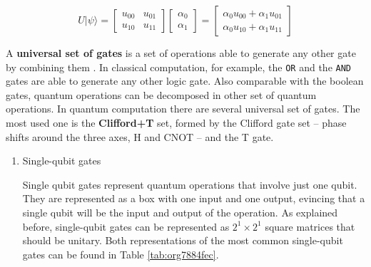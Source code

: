 \begin{enumerate}
\begin{equation}
\label{eq:org6b853ff}
U |\psi\rangle=\begin{bmatrix}u_{00}&u_{01}\\u_{10}&u_{11}\end{bmatrix} \begin{bmatrix}\alpha_0 \\ \alpha_1 \end{bmatrix} = \begin{bmatrix}\alpha_0 u_{00} + \alpha_1 u_{01} \\ \alpha_0 u_{10} + \alpha_1 u_{11} \end{bmatrix}
\end{equation}

A \textbf{universal set of gates} is a set of operations able to generate any other gate by combining them \cite{Nielsen_2009}.
In classical computation, for example, the \texttt{OR} and the \texttt{AND} gates are able to generate any other logic gate.
Also comparable with the boolean gates, quantum operations can be decomposed in other set of quantum operations.
In quantum computation there are several universal set of gates.
The most used one is the \textbf{Clifford+T} set, formed by the Clifford gate set -- phase shifts around the three axes, H and CNOT -- and the T gate.

\begin{enumerate}
\item Single-qubit gates
\label{sec:orgdcf57d4}

Single qubit gates represent quantum operations that involve just one qubit.
They are represented as a box with one input and one output, evincing that a single qubit will be the input and output of the operation.
As explained before, single-qubit gates can be represented as \(2^1 \times 2^1\) square matrices that should be unitary.
Both representations of the most common single-qubit gates can be found in Table \ref{tab:org7884fec}.


\end{enumerate}
\end{enumerate}
